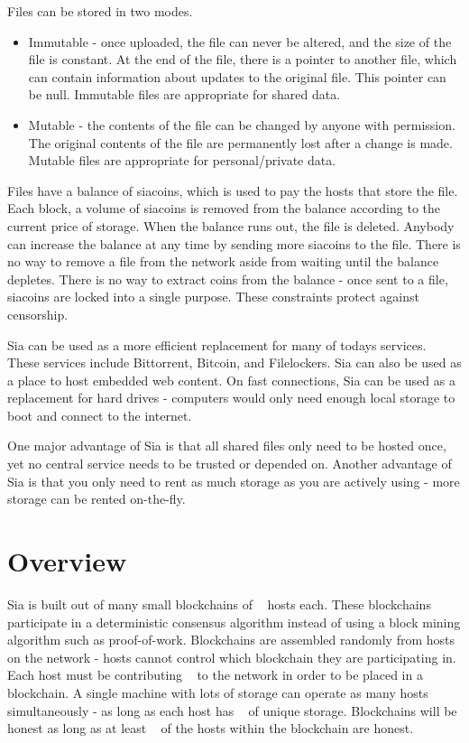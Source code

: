 \documentclass[twocolumn]{article}
\begin{document}
Files can be stored in two modes.
\begin{itemize}
	\item Immutable - once uploaded, the file can never be altered, and the size of the file is constant.
	At the end of the file, there is a pointer to another file, which can contain information about updates to the original file.
	This pointer can be null.
	Immutable files are appropriate for shared data.
	\item Mutable - the contents of the file can be changed by anyone with permission.
	The original contents of the file are permanently lost after a change is made.
	Mutable files are appropriate for personal/private data.
\end{itemize}

Files have a balance of siacoins, which is used to pay the hosts that store the file.
Each block, a volume of siacoins is removed from the balance according to the current price of storage.
When the balance runs out, the file is deleted.
Anybody can increase the balance at any time by sending more siacoins to the file.
There is no way to remove a file from the network aside from waiting until the balance depletes.
There is no way to extract coins from the balance - once sent to a file, siacoins are locked into a single purpose.
These constraints protect against censorship.

Sia can be used as a more efficient replacement for many of todays services.
These services include Bittorrent, Bitcoin, and Filelockers.
Sia can also be used as a place to host embedded web content.
On fast connections, Sia can be used as a replacement for hard drives - computers would only need enough local storage to boot and connect to the internet.

One major advantage of Sia is that all shared files only need to be hosted once, yet no central service needs to be trusted or depended on.
Another advantage of Sia is that you only need to rent as much storage as you are actively using - more storage can be rented on-the-fly.

\section{Overview}

Sia is built out of many small blockchains of \numhosts ~ hosts each.
These blockchains participate in a deterministic consensus algorithm instead of using a block mining algorithm such as proof-of-work.
Blockchains are assembled randomly from hosts on the network - hosts cannot control which blockchain they are participating in.
Each host must be contributing \storageperhost ~ to the network in order to be placed in a blockchain.
A single machine with lots of storage can operate as many hosts simultaneously - as long as each host has \storageperhost ~ of unique storage.
Blockchains will be honest as long as at least \fiftyone ~ of the hosts within the blockchain are honest.
\end{document}
